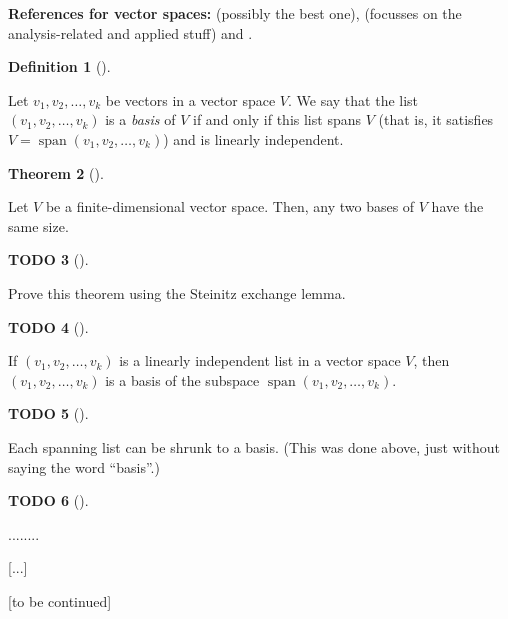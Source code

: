 \documentclass[numbers=enddot,12pt,final,onecolumn,notitlepage]{scrartcl}%
\theoremstyle{definition}
\newtheorem{theo}{Theorem}[section]
\newenvironment{theorem}[1][]
{\begin{theo}[#1]\begin{leftbar}}
{\end{leftbar}\end{theo}}
\newtheorem{defi}[theo]{Definition}
\newenvironment{definition}[1][]
{\begin{defi}[#1]\begin{leftbar}}
{\end{leftbar}\end{defi}}
\newtheorem{quest}[theo]{TODO}
\newenvironment{todo}[1][]
{\begin{quest}[#1]\begin{leftbar}}
{\end{leftbar}\end{quest}}
\begin{document}
\textbf{References for vector spaces:} \cite[\S 5.3-5.4]{LaNaSc16} (possibly
the best one), \cite[\S 2.4]{OlvSha06} (focusses on the analysis-related and
applied stuff) and \cite[Two.III]{Heffer16}.

\begin{definition}
Let $v_{1},v_{2},\ldots,v_{k}$ be vectors in a vector space $V$. We say that
the list $\left(  v_{1},v_{2},\ldots,v_{k}\right)  $ is a \textit{basis} of
$V$ if and only if this list spans $V$ (that is, it satisfies
$V=\operatorname*{span}\left(  v_{1},v_{2},\ldots,v_{k}\right)  $) and is
linearly independent.
\end{definition}

\begin{theorem}
Let $V$ be a finite-dimensional vector space. Then, any two bases of $V$ have
the same size.
\end{theorem}

\begin{todo}
Prove this theorem using the Steinitz exchange lemma.
\end{todo}

\begin{todo}
If $\left(  v_{1},v_{2},\ldots,v_{k}\right)  $ is a linearly independent list
in a vector space $V$, then $\left(  v_{1},v_{2},\ldots,v_{k}\right)  $ is a
basis of the subspace $\operatorname*{span}\left(  v_{1},v_{2},\ldots
,v_{k}\right)  $.
\end{todo}

\begin{todo}
Each spanning list can be shrunk to a basis. (This was done above, just
without saying the word \textquotedblleft basis\textquotedblright.)
\end{todo}

\begin{todo}
........
\end{todo}

[...]

[to be continued]
\end{document}
